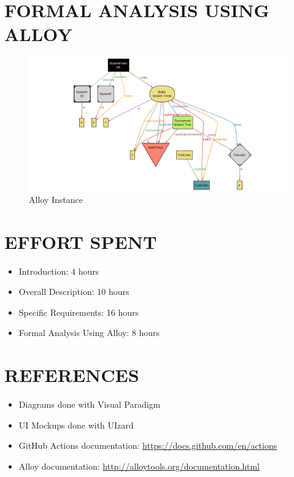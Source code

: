 \documentclass{article}
\begin{document}
\section{FORMAL ANALYSIS USING ALLOY}


\begin{figure}[H]
    \centering
    \includegraphics[width=1\textwidth]{Alloy/instance}
    \caption{Alloy Instance}
    \label{fig:AlloyInstance}
\end{figure}

\section{EFFORT SPENT}

\begin{itemize}
    \item Introduction: 4 hours
    \item Overall Description: 10 hours
    \item Specific Requirements: 16 hours
    \item Formal Analysis Using Alloy: 8 hours
\end{itemize}

\section{REFERENCES}

\begin{itemize}
    \item Diagrams done with Visual Paradigm
    \item UI Mockups done with UIzard
    \item GitHub Actions documentation: \url{https://docs.github.com/en/actions}
    \item Alloy documentation: \url{http://alloytools.org/documentation.html}
\end{itemize}
\end{document}
